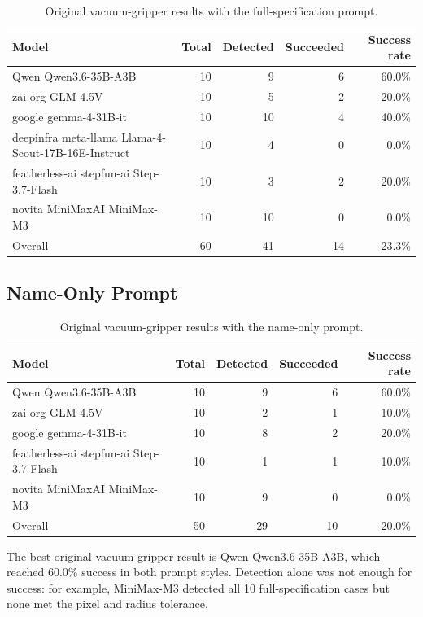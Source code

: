 \documentclass[11pt,a4paper]{article}
\begin{document}
\begin{table}[htbp]
\centering
\small
\begin{tabular}{L{7.0cm}rrrr}
\toprule
Model & Total & Detected & Succeeded & Success rate \\
\midrule
Qwen Qwen3.6-35B-A3B & 10 & 9 & 6 & 60.0\% \\
zai-org GLM-4.5V & 10 & 5 & 2 & 20.0\% \\
google gemma-4-31B-it & 10 & 10 & 4 & 40.0\% \\
deepinfra meta-llama Llama-4-Scout-17B-16E-Instruct & 10 & 4 & 0 & 0.0\% \\
featherless-ai stepfun-ai Step-3.7-Flash & 10 & 3 & 2 & 20.0\% \\
novita MiniMaxAI MiniMax-M3 & 10 & 10 & 0 & 0.0\% \\
\midrule
Overall & 60 & 41 & 14 & 23.3\% \\
\bottomrule
\end{tabular}
\caption{Original vacuum-gripper results with the full-specification prompt.}
\end{table}

\subsection{Name-Only Prompt}

\begin{table}[htbp]
\centering
\small
\begin{tabular}{L{7.0cm}rrrr}
\toprule
Model & Total & Detected & Succeeded & Success rate \\
\midrule
Qwen Qwen3.6-35B-A3B & 10 & 9 & 6 & 60.0\% \\
zai-org GLM-4.5V & 10 & 2 & 1 & 10.0\% \\
google gemma-4-31B-it & 10 & 8 & 2 & 20.0\% \\
featherless-ai stepfun-ai Step-3.7-Flash & 10 & 1 & 1 & 10.0\% \\
novita MiniMaxAI MiniMax-M3 & 10 & 9 & 0 & 0.0\% \\
\midrule
Overall & 50 & 29 & 10 & 20.0\% \\
\bottomrule
\end{tabular}
\caption{Original vacuum-gripper results with the name-only prompt.}
\end{table}

The best original vacuum-gripper result is Qwen Qwen3.6-35B-A3B, which reached 60.0\% success in both prompt styles. Detection alone was not enough for success: for example, MiniMax-M3 detected all 10 full-specification cases but none met the pixel and radius tolerance.
\end{document}

